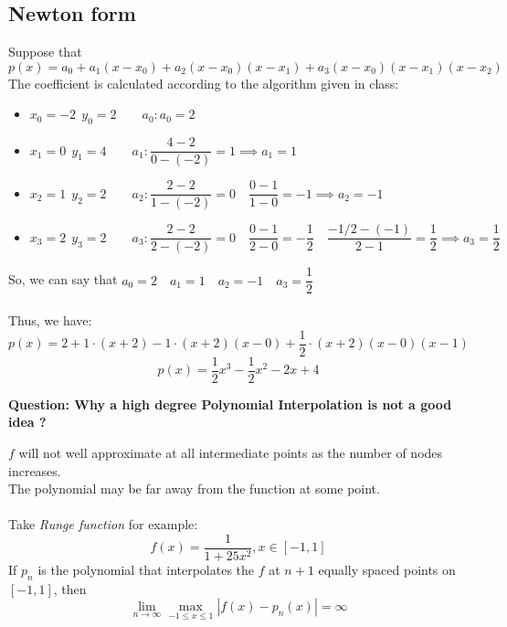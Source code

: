 \documentclass [9 pt]{article}
\theoremstyle{definition}
\begin{document}
\subsection*{Newton form}
Suppose that 
$$p(x) = a_0 + a_1(x - x_0) + a_2(x-x_0)(x- x_1) + a_3(x - x_0)(x - x_1)(x - x_2)$$
The coefficient is calculated according to the algorithm given in class:
\begin{itemize}
	\item $x_0 = -2\ \  y_0 = 2 \quad \quad a_0: a_0 = 2$
	\item $x_1 = 0\ \  y_1 = 4 \quad \quad a_1: \dfrac{4 - 2}{0 - (-2)} = 1 \implies a_1 = 1$
	\item $x_2 = 1\ \  y_2 = 2 \quad \quad a_2: \dfrac{2-2}{1-(-2)} = 0 \quad \dfrac{0 - 1}{1 - 0} = -1 \implies a_2 = -1$
	\item $x_3 = 2\ \  y_3 = 2 \quad \quad  a_3: \dfrac{2-2}{2-(-2)} = 0 \quad \dfrac{0 - 1}{2 - 0} = -\dfrac{1}{2} \quad \dfrac{-1/2 - (-1)}{2 - 1} = \dfrac{1}{2} \implies a_3 = \dfrac{1}{2}$
\end{itemize}
So, we can say that $a_0 = 2 \quad a_1 = 1 \quad a_2 = -1 \quad a_3 = \dfrac{1}{2}$\\
\\
Thus, we have:
$$p(x) = 2 + 1\cdot (x + 2) -1 \cdot (x+2)(x- 0) + \dfrac{1}{2}\cdot (x + 2)(x - 0)(x - 1)$$
$$p(x) = \dfrac{1}{2} x^3 - \dfrac{1}{2} x^2 -2x + 4 $$



\textbf{Question: Why a high degree Polynomial Interpolation is not a good idea ? }
\begin{mdframed}
	$f$ will not well approximate at all intermediate points as the number of nodes increases.\\
	The polynomial may be far away from the function at some point.
	\\
	\\
	Take \textit{ Runge function } for example:
	$$ f(x) = \dfrac{1}{1 + 25x^2}, x \in [-1, 1] $$
	If $p_n$ is the polynomial that interpolates the $f$ at $n+1$ equally spaced points on $[-1, 1]$, then
	$$ \lim_{n \to \infty} \max_{-1 \leq x \leq 1} |f(x) - p_n(x)| = \infty $$
\end{mdframed}
\end{document}
